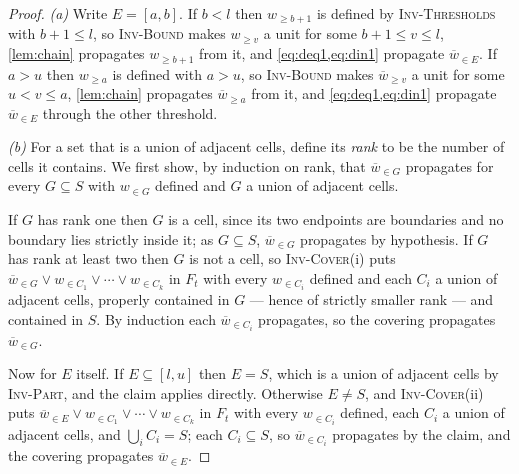 \documentclass[11pt,a4paper]{article}
\theoremstyle{plain}
\theoremstyle{definition}
\theoremstyle{remark}
\newcommand{\atge}[2]{#1_{\geq #2}}
\newcommand{\natge}[2]{\overline{#1}_{\geq #2}}
\newcommand{\atset}[2]{#1_{\in #2}}
\newcommand{\natset}[2]{\overline{#1}_{\in #2}}
\newcommand{\inv}[1]{\textnormal{\textsc{Inv-#1}}}
\newcommand{\invThresholds}{\inv{Thresholds}}
\newcommand{\invPart}{\inv{Part}}
\newcommand{\invCover}{\inv{Cover}}
\begin{document}
\begin{proof}
\emph{(a)}  Write $E=[a,b]$.  If $b<l$ then $\atge{w}{b+1}$ is defined by
\invThresholds{} with $b+1\leq l$, so \inv{Bound} makes $\atge{w}{v}$ a unit for some
$b+1\leq v\leq l$, \cref{lem:chain} propagates $\atge{w}{b+1}$ from it, and
\cref{eq:deq1,eq:din1} propagate $\natset{w}{E}$.  If $a>u$ then $\atge{w}{a}$
is defined with $a>u$, so \inv{Bound} makes $\natge{w}{v}$ a unit for some
$u<v\leq a$, \cref{lem:chain} propagates $\natge{w}{a}$ from it, and
\cref{eq:deq1,eq:din1} propagate $\natset{w}{E}$ through the other threshold.

\emph{(b)}  For a set that is a union of adjacent cells, define its \emph{rank}
to be the number of cells it contains.  We first show, by induction on rank,
that $\natset{w}{G}$ propagates for every $G\subseteq S$ with $\atset{w}{G}$
defined and $G$ a union of adjacent cells.

If $G$ has rank one then $G$ is a cell, since its two endpoints are boundaries
and no boundary lies strictly inside it; as $G\subseteq S$, $\natset{w}{G}$
propagates by hypothesis.  If $G$ has rank at least two then $G$ is not a cell,
so \invCover{}(i) puts
$\natset{w}{G}\vee\atset{w}{C_1}\vee\cdots\vee\atset{w}{C_k}$ in $F_t$ with
every $\atset{w}{C_i}$ defined and each $C_i$ a union of adjacent cells,
properly contained in $G$ --- hence of strictly smaller rank --- and contained
in $S$.  By induction each $\natset{w}{C_i}$ propagates, so the covering
propagates $\natset{w}{G}$.

Now for $E$ itself.  If $E\subseteq[l,u]$ then $E=S$, which is a union of
adjacent cells by \invPart{}, and the claim applies directly.  Otherwise
$E\neq S$, and \invCover{}(ii) puts
$\natset{w}{E}\vee\atset{w}{C_1}\vee\cdots\vee\atset{w}{C_k}$ in $F_t$ with
every $\atset{w}{C_i}$ defined, each $C_i$ a union of adjacent cells, and
$\bigcup_i C_i=S$; each $C_i\subseteq S$, so $\natset{w}{C_i}$ propagates by the
claim, and the covering propagates $\natset{w}{E}$.
\end{proof}
\end{document}
